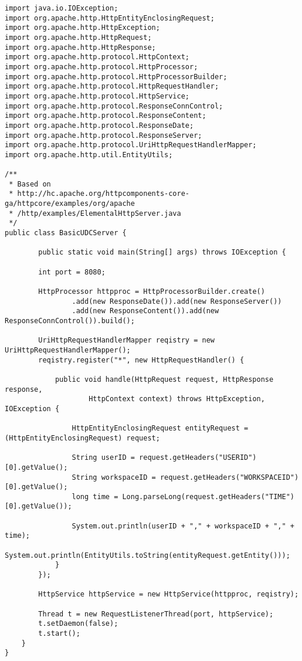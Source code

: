 \begin{lstlisting}
import java.io.IOException;
import org.apache.http.HttpEntityEnclosingRequest;
import org.apache.http.HttpException;
import org.apache.http.HttpRequest;
import org.apache.http.HttpResponse;
import org.apache.http.protocol.HttpContext;
import org.apache.http.protocol.HttpProcessor;
import org.apache.http.protocol.HttpProcessorBuilder;
import org.apache.http.protocol.HttpRequestHandler;
import org.apache.http.protocol.HttpService;
import org.apache.http.protocol.ResponseConnControl;
import org.apache.http.protocol.ResponseContent;
import org.apache.http.protocol.ResponseDate;
import org.apache.http.protocol.ResponseServer;
import org.apache.http.protocol.UriHttpRequestHandlerMapper;
import org.apache.http.util.EntityUtils;

/**
 * Based on
 * http://hc.apache.org/httpcomponents-core-ga/httpcore/examples/org/apache
 * /http/examples/ElementalHttpServer.java
 */
public class BasicUDCServer {

		public static void main(String[] args) throws IOException {

		int port = 8080;

		HttpProcessor httpproc = HttpProcessorBuilder.create()
				.add(new ResponseDate()).add(new ResponseServer())
				.add(new ResponseContent()).add(new ResponseConnControl()).build();

		UriHttpRequestHandlerMapper reqistry = new UriHttpRequestHandlerMapper();
		reqistry.register("*", new HttpRequestHandler() {

			public void handle(HttpRequest request, HttpResponse response,
					HttpContext context) throws HttpException, IOException {

				HttpEntityEnclosingRequest entityRequest = (HttpEntityEnclosingRequest) request;

				String userID = request.getHeaders("USERID")[0].getValue();
				String workspaceID = request.getHeaders("WORKSPACEID")[0].getValue();
				long time = Long.parseLong(request.getHeaders("TIME")[0].getValue());

				System.out.println(userID + "," + workspaceID + "," + time);
				System.out.println(EntityUtils.toString(entityRequest.getEntity()));
			}
		});

		HttpService httpService = new HttpService(httpproc, reqistry);

		Thread t = new RequestListenerThread(port, httpService);
		t.setDaemon(false);
		t.start();
	}
}
\end{lstlisting}

